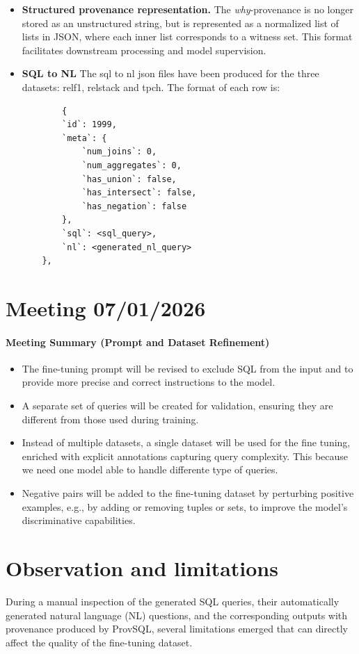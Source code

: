 \documentclass{article}
\begin{document}
\begin{itemize}
    \item \textbf{Structured provenance representation.}  
    The \textit{why}-provenance is no longer stored as an unstructured string, but is represented as a normalized list of lists in JSON, where each inner list corresponds to a witness set. This format facilitates downstream processing and model supervision.
    \item \textbf{SQL to NL }
    The sql to nl json files have been produced for the three datasets: relf1, relstack and tpch.
    The format of each row is:
    \begin{Verbatim}
        {
        `id`: 1999,
        `meta`: {
            `num_joins`: 0,
            `num_aggregates`: 0,
            `has_union`: false,
            `has_intersect`: false,
            `has_negation`: false
        },
        `sql`: <sql_query>,
        `nl`: <generated_nl_query>
    },
    \end{Verbatim}
\end{itemize}

    

\section{Meeting 07/01/2026}
    \paragraph{Meeting Summary (Prompt and Dataset Refinement)}
\begin{itemize}
    \item The fine-tuning prompt will be revised to exclude SQL from the input and to provide more precise and correct instructions to the model.
    \item A separate set of queries will be created for validation, ensuring they are different from those used during training.
    \item Instead of multiple datasets, a single dataset will be used for the fine tuning, enriched with explicit annotations capturing query complexity. This because we need one model able to handle differente type of queries.
    \item Negative pairs will be added to the fine-tuning dataset by perturbing positive examples, e.g., by adding or removing tuples or sets, to improve the model's discriminative capabilities.
\end{itemize}

\section{Observation and limitations}
During a manual inspection of the generated SQL queries, their automatically generated natural language (NL) questions, 
and the corresponding outputs with provenance produced by ProvSQL, several limitations emerged that can directly affect the quality of the fine-tuning dataset.
\end{document}
